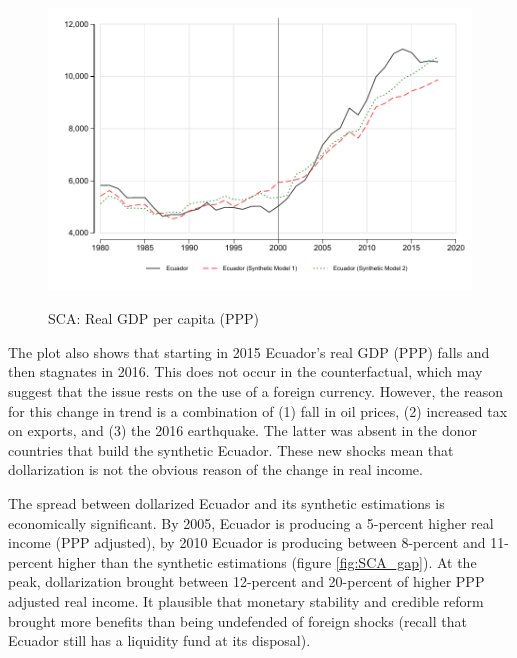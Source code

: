 \documentclass[12pt]{article}
\begin{document}
\begin{figure}[!h]
    \caption{SCA: Real GDP per capita (PPP)}
    \centering
    \includegraphics{STATA/Fig_GDP_SCA.pdf}
    \label{fig:SCA_GDP}
\end{figure}

The plot also shows that starting in 2015 Ecuador's real GDP (PPP) falls and then stagnates in 2016. This does not occur in the counterfactual, which may suggest that the issue rests on the use of a foreign currency. However, the reason for this change in trend is a combination of (1) fall in oil prices, (2) increased tax on exports, and (3) the 2016 earthquake. The latter was absent in the donor countries that build the synthetic Ecuador. These new shocks mean that dollarization is not the obvious reason of the change in real income. 

The spread between dollarized Ecuador and its synthetic estimations is economically significant. By 2005, Ecuador is producing a 5-percent higher real income (PPP adjusted), by 2010 Ecuador is producing between 8-percent and 11-percent higher than the synthetic estimations (figure \ref{fig:SCA_gap}). At the peak, dollarization brought between 12-percent and 20-percent of higher PPP adjusted real income. It plausible that monetary stability and credible reform brought more benefits than being undefended of foreign shocks (recall that Ecuador still has a liquidity fund at its disposal).
\end{document}

